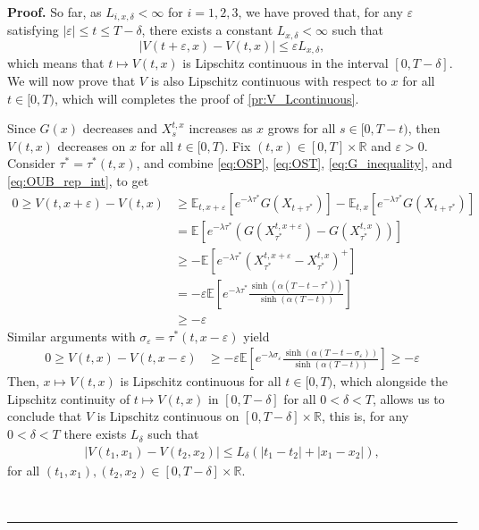 \documentclass{tufte-handout}
\newcommand{\E}{\mathbb{E}} %
\newcommand{\R}{\mathbb{R}} %
\newenvironment{pf}[1][Proof]{\textbf{#1.} }{\ \rule{0.5em}{0.5em}}
\begin{document}
\begin{pf}
		So far, as  $L_{i, x, \delta} < \infty$ for $i =1, 2, 3$, we have proved that, for any $\varepsilon$ satisfying $|\varepsilon| \leq t \leq T - \delta$, there exists a constant $L_{x,\delta} < \infty$ such that
		$$
		|V(t + \varepsilon, x) - V(t, x)| \leq \varepsilon L_{x, \delta},
		$$
		which means that $t\mapsto V(t, x)$ is Lipschitz continuous in the interval $[0, T - \delta]$. We will now prove that $V$ is also Lipschitz continuous with respect to $x$ for all $t\in [0, T)$, which will completes the proof of \ref{pr:V_Lcontinuous}.
		
		Since $G(x)$ decreases and $X_s^{t, x}$ increases as $x$ grows for all $s\in[0, T - t)$, then $V(t, x)$ decreases on $x$ for all $t\in[0, T)$. Fix $(t, x)\in[0, T]\times\R$ and $\varepsilon > 0$. Consider $\tau^* = \tau^*(t, x)$, and combine \eqref{eq:OSP}, \eqref{eq:OST}, \eqref{eq:G_inequality}, and \eqref{eq:OUB_rep_int}, to get 
		\begin{align}
			0 \geq V(t, x + \varepsilon) - V(t, x) &\geq \E_{t, x + \varepsilon}\left[e^{-\lambda\tau^*}G(X_{t + \tau^*})\right] - \E_{t, x}\left[e^{-\lambda\tau^*}G(X_{t + \tau^*})\right] \nonumber \\
			&= \E\left[e^{-\lambda\tau^*}\left(G(X_{\tau^*}^{t, x + \varepsilon}) - G(X_{\tau^*}^{t, x})\right)\right] \nonumber\\
			&\geq -\E\left[e^{-\lambda\tau^*}\left(X_{\tau^*}^{t, x + \varepsilon} - X_{\tau^*}^{t, x}\right)^+\right] \nonumber\\
			&= -\varepsilon\E\left[e^{-\lambda\tau^*}\frac{\sinh(\alpha (T - t - \tau^*))}{\sinh(\alpha (T - t))}\right] \label{eq:Vx+eps-Vx}  \\
			&\geq -\varepsilon \nonumber
		\end{align}
		Similar arguments with $\sigma_\varepsilon = \tau^*(t, x - \varepsilon)$ yield
		\begin{align*}
		0 \geq V(t, x) - V(t, x - \varepsilon) &\geq -\varepsilon\E\left[e^{-\lambda\sigma_\varepsilon}\frac{\sinh(\alpha (T - t - \sigma_\varepsilon))}{\sinh(\alpha (T - t))}\right] \geq -\varepsilon
		\end{align*}
		Then, $x\mapsto V(t, x)$ is Lipschitz continuous for all $t\in[0, T)$, which alongside the Lipschitz continuity of $t\mapsto V(t, x)$	in $[0, T - \delta]$ for all $0 < \delta < T$, allows us to conclude that $V$ is Lipschitz continuous on $[0, T - \delta]\times\R$, this is, for any $0 < \delta < T$ there exists $L_\delta$ such that
		\begin{align*}
			|V(t_1, x_1) - V(t_2, x_2)| \leq L_\delta(|t_1 - t_2| + |x_1 - x_2|),
		\end{align*} 
		for all $(t_1, x_1), (t_2, x_2) \in [0, T - \delta]\times\R$.\\  \vspace{0.3cm}
		


\end{pf}
\end{document}

